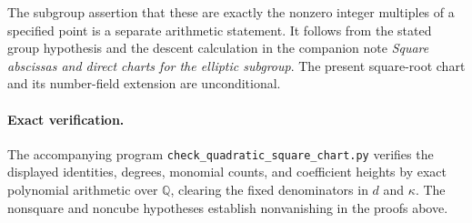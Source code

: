 \documentclass[11pt,a4paper]{article}
\newcommand{\Q}{\mathbb Q}
\begin{document}
The subgroup assertion that these are exactly the nonzero
integer multiples of a specified point is a separate arithmetic
statement. It follows from the stated group hypothesis and the
descent calculation in the companion note
\emph{Square abscissas and direct charts for the elliptic subgroup}.
The present square-root chart and its number-field extension are
unconditional.

\paragraph{Exact verification.}
The accompanying program \texttt{check\_quadratic\_square\_chart.py}
verifies the displayed identities, degrees, monomial counts, and
coefficient heights by exact polynomial arithmetic over $\Q$,
clearing the fixed denominators in $d$ and $\kappa$.
The nonsquare and noncube hypotheses establish nonvanishing in
the proofs above.
\end{document}
